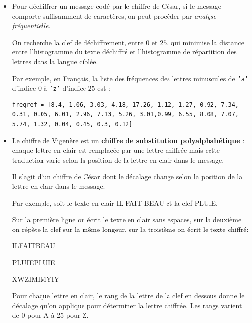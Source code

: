 \documentclass[a4paper, french, 12pt]{article}  %
\newcounter{act}
\begin{document}
\begin{itemize}
\item Pour déchiffrer un message codé par le chiffre de César, si le message comporte suffisamment de caractères, on peut procéder par \textit{analyse fréquentielle}. 

On recherche la clef de déchiffrement, entre $0$ et $25$, qui minimise la distance entre l'histogramme du texte déchiffré et l'histogramme de répartition des lettres dans la langue ciblée.

Par exemple, en Français, la liste des fréquences des lettres minuscules de \texttt{'a'} d'indice $0$ à \texttt{'z'} d'indice $25$ est :

\begin{lstlisting}
freqref = [8.4, 1.06, 3.03, 4.18, 17.26, 1.12, 1.27, 0.92, 7.34, 0.31, 0.05, 6.01, 2.96, 7.13, 5.26, 3.01,0.99, 6.55, 8.08, 7.07, 5.74, 1.32, 0.04, 0.45, 0.3, 0.12]
\end{lstlisting}


\item Le chiffre de Vigenère est un \textbf{chiffre de substitution polyalphabétique} : chaque lettre en clair est remplacée par une lettre chiffrée mais cette traduction varie selon la position de la lettre en clair dans le message.


Il s'agit d'un chiffre de César dont le décalage change selon la position de la lettre en clair dans le message.

Par exemple, soit le texte en clair  IL FAIT BEAU et la clef PLUIE. 

Sur la première ligne on  écrit le texte en clair sans espaces, sur la deuxième  on répète la clef sur la m\^eme longeur, sur la troisième on écrit le texte chiffré:

\begin{center}
ILFAITBEAU

PLUIEPLUIE

XWZIMIMYIY
\end{center}

Pour chaque lettre en clair, le rang de la lettre de la clef en dessous donne le décalage qu'on  applique pour déterminer la lettre chiffrée. Les rangs varient de 0 pour A à 25 pour Z.


\end{itemize}
\end{document}
